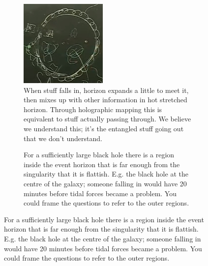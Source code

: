 \documentclass[]{article}
\begin{document}
{\begin{appendices}
	
	\begin{figure}[H]
		\begin{center}
			\caption{	Questions.}
			\begin{subfigure}[t]{0.45\textwidth}
				\caption{When stuff falls in, horizon expands  a little to meet it, then mixes up with other information in hot stretched horizon. Through holographic mapping this is equivalent to stuff actually passing through. We believe we understand this; it's the entangled stuff going out that we don't understand.}\label{fig:ibh-horizon-falling-in}
				\includegraphics[width=\textwidth]{ibh-horizon-falling-in}
			\end{subfigure}
			\;
			\begin{subfigure}[t]{0.45\textwidth}
				\caption{For a sufficiently large black hole there is a region inside the event horizon that is far enough from the singularity that it is flattish. E.g. the black hole at the centre of the galaxy; someone falling in would have 20 minutes before tidal forces became a problem. You could frame the questions to refer to the outer regions.}\label{fig:ibh-horizon-inside-large}

\end{subfigure}
\end{center}
\end{figure}
\end{appendices}}
\end{document}
